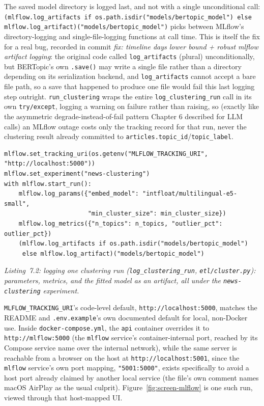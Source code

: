 \begin{sloppypar}
The saved model directory is logged last, and not with a single unconditional call: \texttt{(mlflow.log\_artifacts if os.path.isdir("models/\allowbreak bertopic\_model") else mlflow.log\_artifact)("models/\allowbreak bertopic\_model")} picks between MLflow's directory-logging and single-file-logging functions at call time. This is itself the fix for a real bug, recorded in commit \textit{fix: timeline days lower bound + robust mlflow artifact logging}: the original code called \texttt{log\_artifacts} (plural) unconditionally, but BERTopic's own \texttt{.save()} may write a single file rather than a directory depending on its serialization backend, and \texttt{log\_artifacts} cannot accept a bare file path, so a save that happened to produce one file would fail this last logging step outright. \texttt{run\_clustering} wraps the entire \texttt{log\_clustering\_run} call in its own \texttt{try/except}, logging a warning on failure rather than raising, so (exactly like the asymmetric degrade-instead-of-fail pattern Chapter 6 described for LLM calls) an MLflow outage costs only the tracking record for that run, never the clustering result already committed to \texttt{articles.topic\_id}/\texttt{topic\_label}.
\end{sloppypar}

\begin{verbatim}
mlflow.set_tracking_uri(os.getenv("MLFLOW_TRACKING_URI", "http://localhost:5000"))
mlflow.set_experiment("news-clustering")
with mlflow.start_run():
    mlflow.log_params({"embed_model": "intfloat/multilingual-e5-small",
                       "min_cluster_size": min_cluster_size})
    mlflow.log_metrics({"n_topics": n_topics, "outlier_pct": outlier_pct})
    (mlflow.log_artifacts if os.path.isdir("models/bertopic_model")
     else mlflow.log_artifact)("models/bertopic_model")
\end{verbatim}
\begin{center}
\textit{Listing~7.2: logging one clustering run (\texttt{log\_clustering\_run}, \texttt{etl/cluster.py}): parameters, metrics, and the fitted model as an artifact, all under the \texttt{news-clustering} experiment.}
\end{center}

\begin{sloppypar}
\texttt{MLFLOW\_TRACKING\_URI}'s code-level default, \texttt{http://localhost:5000}, matches the README and \texttt{.env.example}'s own documented default for local, non-Docker use. Inside \texttt{docker-compose.yml}, the \texttt{api} container overrides it to \texttt{http://mlflow:5000} (the \texttt{mlflow} service's container-internal port, reached by its Compose service name over the internal network), while the same server is reachable from a browser on the host at \texttt{http://localhost:5001}, since the \texttt{mlflow} service's own port mapping, \texttt{"5001:5000"}, exists specifically to avoid a host port already claimed by another local service (the file's own comment names macOS AirPlay as the usual culprit). Figure~\ref{fig:screen-mlflow} is one such run, viewed through that host-mapped UI.
\end{sloppypar}

